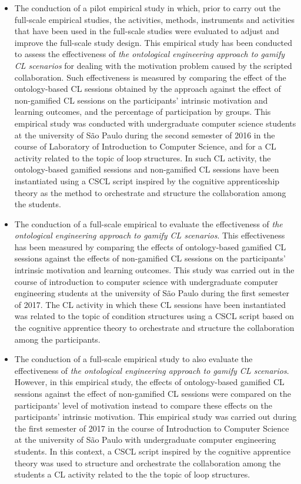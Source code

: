 \begin{description}
\begin{itemize}
\item
The conduction of a pilot empirical study in which, prior to carry out the full-scale empirical studies, the activities, methods, instruments and activities that have been used in the full-scale studies were evaluated to adjust and improve the full-scale study design. This empirical study has been conducted to assess the effectiveness of \emph{the ontological engineering approach to gamify CL scenarios} for dealing with the motivation problem caused by the scripted collaboration. Such effectiveness is measured by comparing the effect of the ontology-based CL sessions obtained by the approach against the effect of non-gamified CL sessions on the participants' intrinsic motivation and learning outcomes, and the percentage of participation by groups. This empirical study was conducted with undergraduate computer science students at the university of São Paulo during the second semester of 2016 in the course of Laboratory of Introduction to Computer Science, and for a CL activity related to the topic of loop structures. In such CL activity, the ontology-based gamified sessions and non-gamified CL sessions have been instantiated using a CSCL script inspired by the cognitive apprenticeship theory as the method to orchestrate and structure the collaboration among the students.

\item
The conduction of a full-scale empirical to evaluate the effectiveness of \emph{the ontological engineering approach to gamify CL scenarios}. This effectiveness has been measured by comparing the effects of ontology-based gamified CL sessions against the effects of non-gamified CL sessions on the participants' intrinsic motivation and learning outcomes. This study was carried out in the course of introduction to computer science with undergraduate computer engineering students at the university of São Paulo during the first semester of 2017. The CL activity in which these CL sessions have been instantiated was related to the topic of condition structures using a CSCL script based on the cognitive apprentice theory to orchestrate and structure the collaboration among the participants.

\item
The conduction of a full-scale empirical study to also evaluate the effectiveness of \emph{the ontological engineering approach to gamify CL scenarios}. However, in this empirical study, the effects of ontology-based gamified CL sessions against the effect of non-gamified CL sessions were compared on the participants' level of motivation instead to compare these effects on the participants' intrinsic motivation. This empirical study was carried out during the first semester of 2017 in the course of Introduction to Computer Science at the university of São Paulo with undergraduate computer engineering students. In this context, a CSCL script inspired by the cognitive apprentice theory was used to structure and orchestrate the collaboration among the students a CL activity related to the the topic of loop structures.


\end{itemize}
\end{description}
